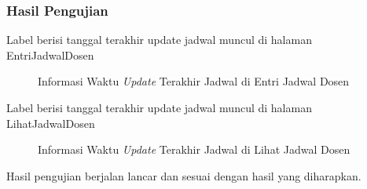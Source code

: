 \subsubsection{Hasil Pengujian}
Label berisi tanggal terakhir update jadwal muncul di halaman EntriJadwalDosen
\begin{figure} [H]
	\centering  
	\caption[Informasi Waktu \textit{Update} Terakhir Jadwal di Entri Jadwal Dosen]{Informasi Waktu \textit{Update} Terakhir Jadwal di Entri Jadwal Dosen} 
	\label{fig:flow-chart-CodeIgniter} 
\end{figure}
Label berisi tanggal terakhir update jadwal muncul di halaman LihatJadwalDosen
\begin{figure} [H]
	\centering  
	\caption[Informasi Waktu \textit{Update} Terakhir Jadwal di Lihat Jadwal Dosen]{Informasi Waktu \textit{Update} Terakhir Jadwal di Lihat Jadwal Dosen} 
	\label{fig:flow-chart-CodeIgniter} 
\end{figure}
Hasil pengujian berjalan lancar dan sesuai dengan hasil yang diharapkan.